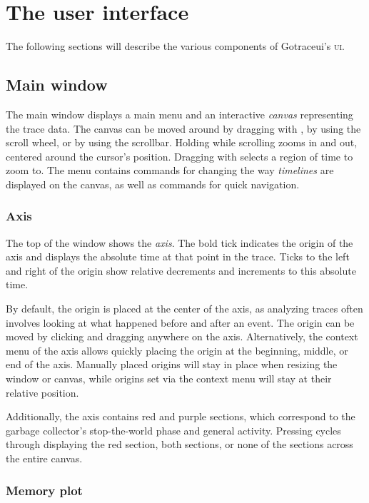 \documentclass[10pt,letterpaper,oneside,openany,english]{memoir}
\newcommand{\noun}[1]{{\emph{#1}}}
\newcommand{\shortcut}{\ctrl{} or \cmdmac}
\begin{document}
\chapter{The user interface}
The following sections will describe the various components of Gotraceui's \textsc{ui}.

\section{Main window}
The main window displays a main menu and an interactive \noun{canvas} representing the trace data.
The canvas can be moved around by dragging with , by using the scroll wheel, or by using the scrollbar.
Holding \keys{\shortcut} while scrolling zooms in and out, centered around the cursor's position.
Dragging with \keys{\shortcut + LMB} selects a region of time to zoom to.
The  menu contains commands for changing the way \noun{timelines} are displayed on the canvas,
as well as commands for quick navigation.

\subsection{Axis}
The top of the window shows the \noun{axis}.
The bold tick indicates the origin of the axis and displays the absolute time at that point in the trace.
Ticks to the left and right of the origin show relative decrements and increments to this absolute time.

By default, the origin is placed at the center of the axis,
as analyzing traces often involves looking at what happened before and after an event.
The origin can be moved by clicking and dragging anywhere on the axis.
Alternatively, the context menu of the axis allows quickly placing the origin at the beginning, middle, or end of the axis.
Manually placed origins will stay in place when resizing the window or canvas,
while origins set via the context menu will stay at their relative position.

Additionally, the axis contains red and purple sections,
which correspond to the garbage collector's stop-the-world phase and general activity.
Pressing  cycles through displaying the red section, both sections, or none of the sections across the entire canvas.

\subsection{Memory plot}
\end{document}
